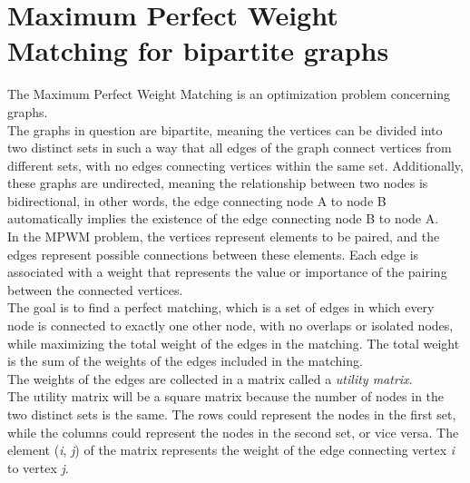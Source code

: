 \section{Maximum Perfect Weight Matching for bipartite graphs}
The Maximum Perfect Weight Matching is an optimization problem concerning graphs. \\
The graphs in question are bipartite, meaning the vertices can be divided into two distinct sets in such a way that all edges of the graph connect vertices from different sets, with no edges connecting vertices within the same set.
Additionally, these graphs are undirected, meaning the relationship between two nodes is bidirectional, in other words, the edge connecting node A to node B automatically implies the existence of the edge connecting node B to node A. \\
In the MPWM problem, the vertices represent elements to be paired, and the edges represent possible connections between these elements. Each edge is associated with a weight that represents the value or importance of the pairing between the connected vertices. \\
The goal is to find a perfect matching, which is a set of edges in which every node is connected to exactly one other node, with no overlaps or isolated nodes, while maximizing the total weight of the edges in the matching.
The total weight is the sum of the weights of the edges included in the matching. \\
The weights of the edges are collected in a matrix called a \textit{utility matrix}.\\
The utility matrix will be a square matrix because the number of nodes in the two distinct sets is the same.
The rows could represent the nodes in the first set, while the columns could represent the nodes in the second set, or vice versa.
The element (\textit{i}, \textit{j}) of the matrix represents the weight of the edge connecting vertex \textit{i} to vertex \textit{j}. 


